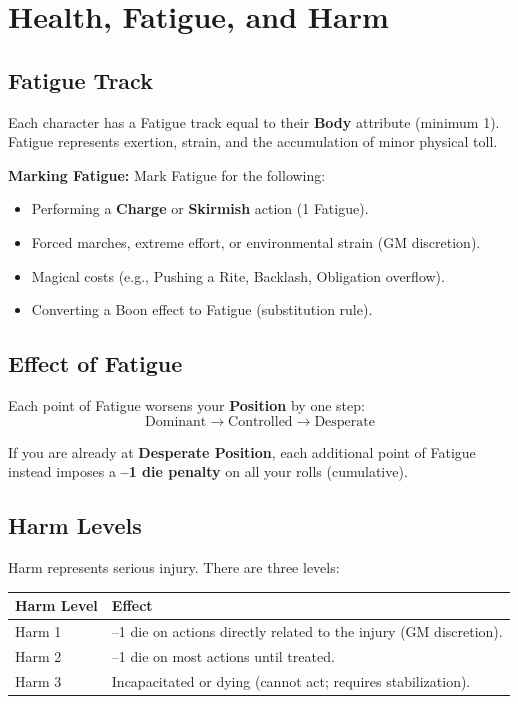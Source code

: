 
\section{Health, Fatigue, and Harm}

\subsection{Fatigue Track}

Each character has a Fatigue track equal to their \textbf{Body} attribute (minimum 1). Fatigue represents exertion, strain, and the accumulation of minor physical toll.

\textbf{Marking Fatigue:} Mark Fatigue for the following:
\begin{itemize}
  \item Performing a \textbf{Charge} or \textbf{Skirmish} action (1 Fatigue).
  \item Forced marches, extreme effort, or environmental strain (GM discretion).
  \item Magical costs (e.g., Pushing a Rite, Backlash, Obligation overflow).
  \item Converting a Boon effect to Fatigue (substitution rule).
\end{itemize}

\subsection{Effect of Fatigue}

Each point of Fatigue worsens your \textbf{Position} by one step:
\[
\text{Dominant} \rightarrow \text{Controlled} \rightarrow \text{Desperate}
\]

If you are already at \textbf{Desperate Position}, each additional point of Fatigue instead imposes a \textbf{–1 die penalty} on all your rolls (cumulative).

\subsection{Harm Levels}

Harm represents serious injury. There are three levels:

\begin{tabular}{@{}ll@{}}
\toprule
\textbf{Harm Level} & \textbf{Effect} \\
\midrule
Harm 1 & –1 die on actions directly related to the injury (GM discretion). \\
Harm 2 & –1 die on most actions until treated. \\
Harm 3 & Incapacitated or dying (cannot act; requires stabilization). \\
\bottomrule
\end{tabular}

